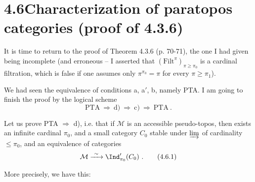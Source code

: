 

\section*{4.6\quad Characterization of paratopos categories (proof of 4.3.6)}

It is time to return to the proof of Theorem 4.3.6 (p. 70-71), the one I had given being incomplete (and erroneous – I asserted that $(\mathrm{Filt}^{\pi})_{\pi\geqslant\pi_0}$ is a cardinal filtration, which is false if one assumes only $\pi^{\pi_0}=\pi$ for every $\pi\geqslant\pi_1$).

We had seen the equivalence of conditions a, a$'$, b, namely PTA. I am going to finish the proof by the logical scheme
\[
\text{PTA} \ \Longrightarrow\ \text{d)} \ \Longrightarrow\ \text{c)} \ \Longrightarrow\ \text{PTA}\ . \tag*{$(*)$}
\]

Let us prove PTA $\Longrightarrow$ d), i.e. that if $\mathcal{M}$ is an accessible pseudo-topos, then exists an infinite cardinal $\pi_0$, and a small category $C_0$ stable under $\varinjlim$ of cardinality $\leqslant\pi_0$, and an equivalence of categories %
\[
\mathcal{M} \xrightarrow{\ \sim\ } \Ind'_{\pi_0}(C_0)\ . \tag*{(4.6.1)}
\]

More precisely, we have this:


